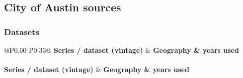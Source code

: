 \subsection*{City of Austin sources}
\subsubsection*{Datasets}
{\scriptsize\raggedright
\begin{longtable}{@{}P{0.60\textwidth} P{0.33\textwidth}@{}}
\toprule
\textbf{Series / dataset (vintage)} & \textbf{Geography \& years used} \\
\midrule
\endfirsthead
{}\\
\toprule
\textbf{Series / dataset (vintage)} & \textbf{Geography \& years used} \\
\midrule
\endhead
\bottomrule
\endfoot


\end{longtable}}
